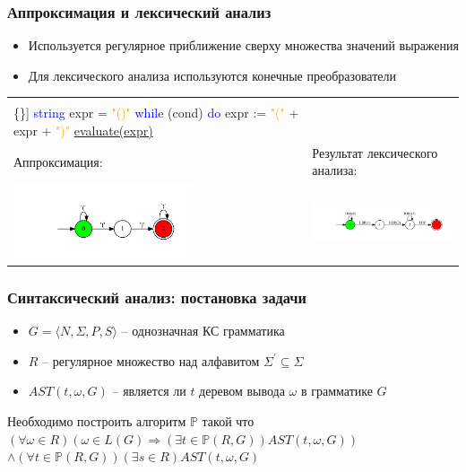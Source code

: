 \documentclass{beamer}
\begin{document}
\begin{frame}[fragile]
    \transwipe[direction=90]
    \frametitle{Аппроксимация и лексический анализ}    
    \begin{itemize}    
        \item Используется регулярное приближение сверху множества значений выражения  
        \item Для лексического анализа используются конечные преобразователи
    \end{itemize}

\begin{center}
    \begin{tabular}{p{6cm}|p{6cm}}
    \begin{minipage}{3in}

        \begin{Verbatim}[commandchars=\\\{\}]
\textcolor{blue}{string} expr = \textcolor{orange}{"()"}
\textcolor{blue}{while} (cond) \textcolor{blue}{do} 
    expr := \textcolor{orange}{"("} + expr + \textcolor{orange}{")"}
\underline{evaluate(expr)}  
        \end{Verbatim}
    \end{minipage}
&
\\      
Аппроксимация: & Результат лексического анализа:
\\
\includegraphics[width=150pt]{pictures/in3_appr.pdf}
&
\includegraphics[width=160pt]{pictures/in3.pdf}

    \end{tabular}
\end{center}
\end{frame}

\begin{frame}
    \transwipe[direction=90]
    \frametitle{Синтаксический анализ: постановка задачи}
    \begin{itemize}    
        \item $G=\langle N,\Sigma, P,S\rangle$ -- однозначная КС грамматика
        \item $R$ -- регулярное множество над алфавитом ${\Sigma}^{'} \subseteq \Sigma $
        \item $AST(t,\omega,G)$ -- является ли $t$ деревом вывода $\omega$ в грамматике $G$
    \end{itemize}
    Необходимо построить алгоритм $\mathbb{P}$ такой что
    $(\forall \omega \in R) (\omega \in L(G) \Rightarrow (\exists t \in \mathbb{P}(R,G))AST(t, \omega, G))$
    $\land (\forall t \in \mathbb{P}(R,G))(\exists s \in R)AST(t,\omega,G)$
\end{frame}
\end{document}
